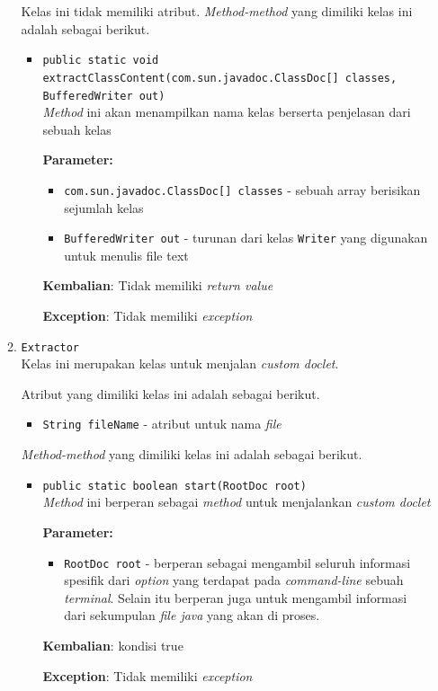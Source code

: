 \documentclass[a4paper,twoside]{article}
\begin{document}
\begin{enumerate}
\begin{enumerate}
Kelas ini tidak memiliki atribut. \textit{Method-method} yang dimiliki kelas ini adalah sebagai berikut.
\begin{itemize}
\item \texttt{public static void extractClassContent(com.sun.javadoc.ClassDoc[] classes, BufferedWriter out)}\\ 
\textit{Method} ini akan menampilkan nama kelas berserta penjelasan dari sebuah kelas

\textbf{Parameter:}
\begin{itemize}
\item \texttt{com.sun.javadoc.ClassDoc[] classes} - 
sebuah array berisikan sejumlah kelas
\item \texttt{BufferedWriter out} - 
turunan dari kelas \texttt{Writer} yang digunakan untuk menulis file text
\end{itemize}
\textbf{Kembalian}: Tidak memiliki \textit{return value}

\textbf{Exception}: Tidak memiliki \textit{exception}

\end{itemize}
\item \texttt{Extractor}\\ 
Kelas ini merupakan kelas untuk menjalan \textit{custom doclet}.

Atribut yang dimiliki kelas ini adalah sebagai berikut.
\begin{itemize}
\item \texttt{String fileName} - atribut untuk nama \textit{file}
\end{itemize}
\textit{Method-method} yang dimiliki kelas ini adalah sebagai berikut.
\begin{itemize}
\item \texttt{public static boolean start(RootDoc root)}\\ 
\textit{Method} ini berperan sebagai \textit{method} untuk menjalankan
 \textit{custom doclet}

\textbf{Parameter:}
\begin{itemize}
\item \texttt{RootDoc root} - 
berperan sebagai mengambil seluruh informasi spesifik dari
 \textit{option} yang terdapat pada \textit{command-line} sebuah
 \textit{terminal}. Selain itu berperan juga untuk mengambil informasi dari
 sekumpulan \textit{file java} yang akan di proses.
\end{itemize}
\textbf{Kembalian}: kondisi true

\textbf{Exception}: Tidak memiliki \textit{exception}


\end{itemize}
\end{enumerate}
\end{enumerate}
\end{document}
